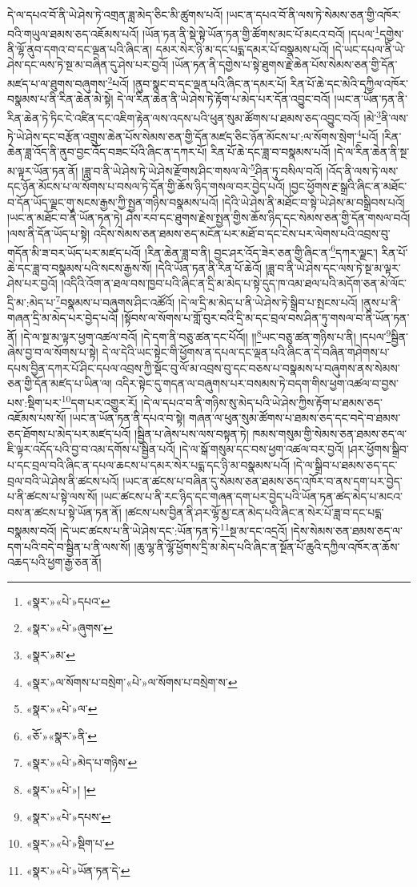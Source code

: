 དེ་ལ་དཔའ་བོ་ནི་ཡེ་ཤེས་ཏེ་འགྲན་ཟླ་མེད་ཅིང་མི་ཚུགས་པའོ། །ཡང་ན་དཔའ་བོ་ནི་ལས་ཏེ་སེམས་ཅན་གྱི་འཁོར་བའི་གཡུལ་ཐམས་ཅད་འཇོམས་པའོ། །ཡོན་ཏན་ནི་སྡེ་སྟེ་ཡོན་ཏན་གྱི་ཚོགས་མང་པོ་མངའ་བའོ། །དཔལ་\footnote{«སྣར་»«པེ་»དཔའ་}དགྱེས་ནི་ལྷོ་ནུབ་དགའ་བ་དང་ལྡན་པའི་ཞིང་ན། དམར་སེར་ཉི་མ་དང་པདྨ་དམར་པོ་བསྣམས་པའོ། །དེ་ཡང་དཔལ་ནི་ཡེ་ཤེས་དང་ལས་ཏེ་སྔ་མ་བཞིན་དུ་ཤེས་པར་བྱའོ། །ཡོན་ཏན་ནི་དགྱེས་པ་སྟེ་ཐུགས་རྗེ་ཆེན་པོས་སེམས་ཅན་གྱི་དོན་མཛད་པ་ལ་ཐུགས་བཞུགས་\footnote{«སྣར་»«པེ་»ཞུགས་}པའོ། །ནུབ་སྣང་བ་དང་ལྡན་པའི་ཞིང་ན་དམར་པོ། རིན་པོ་ཆེ་དང་མེའི་དཀྱིལ་འཁོར་བསྣམས་པ་ནི་རིན་ཆེན་མེ་སྟེ། དེ་ལ་རིན་ཆེན་ནི་ཡེ་ཤེས་ཏེ་རྟོག་པ་མེད་པར་དོན་འབྱུང་བའོ། །ཡང་ན་ཡོན་ཏན་ནི་རིན་ཆེན་ཏེ་ཏིང་ངེ་འཛིན་དང་འཇིག་རྟེན་ལས་འདས་པའི་ཕུན་སུམ་ཚོགས་པ་ཐམས་ཅད་འབྱུང་བའོ། །མེ་\footnote{«སྣར་»མ་}ནི་ལས་ཏེ་ཡེ་ཤེས་དང་བརྩོན་འགྲུས་ཆེན་པོས་སེམས་ཅན་གྱི་དོན་མཛད་ཅིང་ཉོན་མོངས་པ་:ལ་སོགས་སྲེག་\footnote{«སྣར་»ལ་སོགས་པ་བསྲེག་«པེ་»ལ་སོགས་པ་བསྲེག་ས་}པའོ། །རིན་ཆེན་ཟླ་འོད་ནི་ནུབ་བྱང་འོད་བཟང་པོའི་ཞིང་ན་དཀར་པོ། རིན་པོ་ཆེ་དང་ཟླ་བ་བསྣམས་པའོ། །དེ་ལ་རིན་ཆེན་ནི་སྔ་མ་ལྟར་ཡོན་ཏན་ནོ། །ཟླ་བ་ནི་ཡེ་ཤེས་ཏེ་ཡེ་ཤེས་རྫོགས་ཤིང་གསལ་ལེ་\footnote{«སྣར་»«པེ་»ལ་}ཤིན་ཏུ་བསིལ་བའོ། །འོད་ནི་ལས་ཏེ་ལས་དང་ཉོན་མོངས་པ་ལ་སོགས་པ་བསལ་ཏེ་དོན་གྱི་ཆོས་ཉིད་གསལ་བར་བྱེད་པའོ། །བྱང་ཕྱོགས་རྔ་སྒྲའི་ཞིང་ན་མཐོང་བ་དོན་ཡོད་ལྗང་གུ་སངས་རྒྱས་ཀྱི་སྤྱན་གཉིས་བསྣམས་པའོ། །དེའི་ཡེ་ཤེས་ནི་མཐོང་བ་སྟེ་ཡེ་ཤེས་མ་བསྒྲིབས་པའོ། །ཡང་ན་མཐོང་བ་ནི་ཡོན་ཏན་ཏེ། ཤེས་རབ་དང་ཐུགས་རྗེས་སྤྱན་གྱིས་ཆོས་ཉིད་དང་སེམས་ཅན་གྱི་དོན་གསལ་བའོ། །ལས་ནི་དོན་ཡོད་པ་སྟེ། འདིས་སེམས་ཅན་ཐམས་ཅད་མངོན་པར་མཐོ་བ་དང་ངེས་པར་ལེགས་པའི་འབྲས་བུ་གདོན་མི་ཟ་བར་ཡོད་པར་མཛད་པའོ། །རིན་ཆེན་ཟླ་བ་ནི། བྱང་ཤར་འོད་ཟེར་ཅན་གྱི་ཞིང་ན་\footnote{«ཅོ་»«སྣར་»ནི་}དཀར་ལྗང་། རིན་པོ་ཆེ་དང་ཟླ་བ་བསྣམས་པའི་སངས་རྒྱས་སོ། །དེའི་ཡོན་ཏན་ནི་རིན་པོ་ཆེའོ། །ཟླ་བ་ནི་ཡེ་ཤེས་དང་ལས་ཏེ་སྔ་མ་ལྟར་ཤེས་པར་བྱའོ། །འདིའི་འོག་ན་ཐལ་བས་ཁྱབ་པའི་ཞིང་ན་དྲི་མ་མེད་པ་སྟེ་དུད་ཁ་འམ་ཐལ་པའི་མདོག་ཅན་མེ་ལོང་དྲི་མ་:མེད་པ་\footnote{«སྣར་»«པེ་»མེད་པ་གཉིས་}བསྣམས་པ་བཞུགས་ཤིང་འཚོའོ། །དེ་ལ་དྲི་མ་མེད་པ་ནི་ཡེ་ཤེས་ཏེ་སྒྲིབ་པ་སྤངས་པའོ། །ནུས་པ་ནི་གཞན་དྲི་མ་མེད་པར་བྱེད་པའོ། །སྟོབས་ལ་སོགས་པ་གློ་བུར་བའི་དྲི་མ་དང་བྲལ་བས་ཤིན་ཏུ་གསལ་བ་ནི་ཡོན་ཏན་ནོ། །དེ་ལ་སྔ་མ་ལྟར་ཕྱག་འཚལ་བའོ། །དེ་དག་ནི་བཅུ་ཚན་དང་པོའོ།། །།\footnote{«སྣར་»«པེ་»། །}ཡང་བཅུ་ཚན་གཉིས་པ་ནི། །དཔལ་\footnote{«སྣར་»«པེ་»དཔས་}སྦྱིན་ཞེས་བྱ་བ་ལ་སོགས་པ་སྟེ། དེ་ལ་དེའི་ཡང་སྟེང་གི་ཕྱོགས་ན་དཔལ་དང་ལྡན་པའི་ཞིང་ན་དེ་བཞིན་གཤེགས་པ་དཔས་བྱིན་དཀར་པོ་ཤིང་དཔལ་འབྲས་ཀྱི་སྡོང་བུ་ལོ་མ་འབྲས་བུ་དང་བཅས་པ་བསྣམས་པ་བཞུགས་ནས་སེམས་ཅན་གྱི་དོན་མཛད་པ་ཡིན་ལ། འདིར་སྟེང་དུ་གདན་ལ་བཞུགས་པར་བསམས་ཏེ་བདག་གིས་ཕྱག་འཚལ་བ་བྱས་པས་:སྡིག་པར་\footnote{«སྣར་»«པེ་»སྡིག་པ་}དག་པར་འགྱུར་རོ། །དེ་ལ་དཔའ་བ་ནི་གཉིས་སུ་མེད་པའི་ཡེ་ཤེས་ཀྱིས་རྟོག་པ་ཐམས་ཅད་འཇོམས་པས་སོ། །ཡང་ན་ཡོན་ཏན་ནི་དཔའ་བ་སྟེ། གཞན་ལ་ཕུན་སུམ་ཚོགས་པ་ཐམས་ཅད་དང་བདེ་བ་ཐམས་ཅད་ཐོགས་པ་མེད་པར་མཛད་པའོ། །སྦྱིན་པ་ཞེས་པས་ལས་བསྟན་ཏེ། ཁམས་གསུམ་གྱི་སེམས་ཅན་ཐམས་ཅད་ལ་ཇི་ལྟར་འདོད་པའི་བྱ་བ་འམ་དགོས་པ་སྦྱིན་པའོ། །དེ་ལ་སྒོ་གསུམ་དང་བས་ཕྱག་འཚལ་བར་བྱའོ། །ཤར་ཕྱོགས་སྒྲིབ་པ་དང་བྲལ་བའི་ཞིང་ན་དཔལ་ཆངས་པ་དམར་སེར་པདྨ་དང་ཉི་མ་བསྣམས་པའོ། །དེ་ལ་སྒྲིབ་པ་ཐམས་ཅད་དང་བྲལ་བའི་ཡེ་ཤེས་ནི་ཚངས་པའོ། །ཡང་ན་ཚངས་པ་བཞིན་དུ་སེམས་ཅན་ཐམས་ཅད་འཁོར་བ་ནས་དག་པར་བྱེད་པ་ནི་ཚངས་པ་སྟེ་ལས་སོ། །ཡང་ཚངས་པ་ནི་རང་ཉིད་དང་གཞན་དག་པར་བྱེད་པའི་ཡོན་ཏན་ཚད་མེད་པ་མངའ་བས་ན་ཚངས་པ་སྟེ་ཡོན་ཏན་ནོ། །ཚངས་པས་བྱིན་ནི་ཤར་ལྷོ་མྱ་ངན་མེད་པའི་ཞིང་ན་སེར་པོ་ཟླ་བ་དང་པདྨ་བསྣམས་བའོ། །དེ་ཡང་ཚངས་པ་ནི་ཡེ་ཤེས་དང་:ཡོན་ཏན་ཏེ་\footnote{«སྣར་»«པེ་»ཡོན་ཏན་དེ་}སྔ་མ་དང་འདྲའོ། །དེས་སེམས་ཅན་ཐམས་ཅད་ལ་དག་པའི་བདེ་བ་སྦྱིན་པ་ནི་ལས་སོ། །ཆུ་ལྷ་ནི་ལྷོ་ཕྱོགས་དྲི་མ་མེད་པའི་ཞིང་ན་སྔོན་པོ་ཆུའི་དཀྱིལ་འཁོར་ན་ཆོས་འཆད་པའི་ཕྱག་རྒྱ་ཅན་ནོ། 